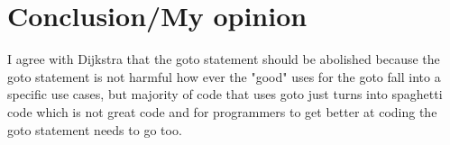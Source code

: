 \documentclass{article}
\begin{document}
\section{Conclusion/My opinion}
I agree with Dijkstra that the goto statement should be abolished because the goto statement is not harmful how ever the "good" uses for the goto fall into a specific use cases\cite{Wulf:1972:CAG:800194.805861}, but majority of code that uses goto just turns into spaghetti code which is not great code and for programmers to get better at coding the goto statement needs to go too.





\end{document}
